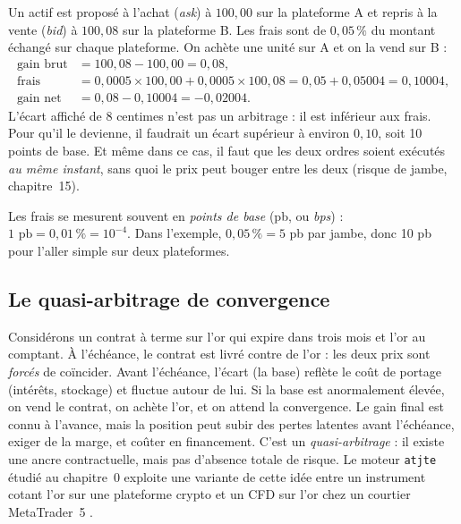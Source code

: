 \begin{example}\label{c1:ex:spatial}
Un actif est proposé à l'achat (\emph{ask}) à $100{,}00$ sur la plateforme A et repris à la vente (\emph{bid}) à $100{,}08$ sur la plateforme B. Les frais sont de $0{,}05\,\%$ du montant échangé sur chaque plateforme. On achète une unité sur A et on la vend sur B :
\begin{align*}
\text{gain brut} &= 100{,}08 - 100{,}00 = 0{,}08,\\
\text{frais} &= 0{,}0005 \times 100{,}00 + 0{,}0005 \times 100{,}08 = 0{,}05 + 0{,}05004 = 0{,}10004,\\
\text{gain net} &= 0{,}08 - 0{,}10004 = -0{,}02004.
\end{align*}
L'écart affiché de 8 centimes n'est pas un arbitrage : il est inférieur aux frais. Pour qu'il le devienne, il faudrait un écart supérieur à environ $0{,}10$, soit 10 points de base. Et même dans ce cas, il faut que les deux ordres soient exécutés \emph{au même instant}, sans quoi le prix peut bouger entre les deux (risque de jambe, chapitre~15).
\end{example}

\begin{remark}
Les frais se mesurent souvent en \emph{points de base} (pb, ou \emph{bps}) : $1\text{ pb} = 0{,}01\,\% = 10^{-4}$. Dans l'exemple, $0{,}05\,\% = 5$ pb par jambe, donc 10 pb pour l'aller simple sur deux plateformes.
\end{remark}

\subsection{Le quasi-arbitrage de convergence}

Considérons un contrat à terme sur l'or qui expire dans trois mois et l'or au comptant. À l'échéance, le contrat est livré contre de l'or : les deux prix sont \emph{forcés} de coïncider. Avant l'échéance, l'écart (la \og base\fg) reflète le coût de portage (intérêts, stockage) et fluctue autour de lui. Si la base est anormalement élevée, on vend le contrat, on achète l'or, et on attend la convergence. Le gain final est connu à l'avance, mais la position peut subir des pertes latentes avant l'échéance, exiger de la marge, et coûter en financement. C'est un \emph{quasi-arbitrage} : il existe une ancre contractuelle, mais pas d'absence totale de risque. Le moteur \texttt{atjte} étudié au chapitre~0 exploite une variante de cette idée entre un instrument cotant l'or sur une plateforme crypto et un CFD sur l'or chez un courtier MetaTrader~5 \citep{atjte}.

